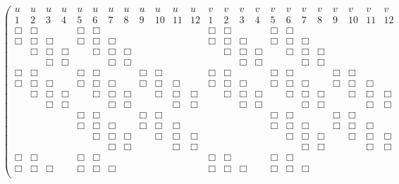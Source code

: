 \begin{equation}
\left(
\begin{array}{cccccccccccccccccccccccc}
u & u & u & u & u & u & u & u & u & u & u & u & 
v & v & v & v & v & v & v & v & v & v & v & v \\
1 & 2 & 3 & 4 & 5 & 6 & 7 & 8 & 9 & 10 & 11 & 12 &
1 & 2 & 3 & 4 & 5 & 6 & 7 & 8 & 9 & 10 & 11 & 12 \\
\Box& \Box & & & \Box & \Box  &  &  & & & & & \Box & \Box &  &  & \Box & \Box &  &  &  &  &  &  \\ %
\Box & \Box & \Box & & \Box & \Box & \Box &  & & & & & \Box & \Box & \Box &  & \Box & \Box & \Box &  &  &  &  &  \\ %
 & \Box &  \Box & \Box &  & \Box & \Box & \Box & & & &  & & \Box & \Box & \Box &  & \Box & \Box & \Box &  &  &  &  \\ %
& & \Box & \Box &  &  & \Box & \Box & & & & &  &  &  \Box & \Box &  &  & \Box & \Box &  &  &  \\ %
\Box& \Box & & & \Box & \Box &  &  & \Box & \Box & & & \Box& \Box & & & \Box & \Box &  &  & \Box & \Box & &   \\ %
\Box& \Box& \Box& & \Box & \Box & \Box &  & \Box & \Box & \Box & &
\Box& \Box& \Box& & \Box & \Box & \Box &  & \Box & \Box & \Box & \\ %
& \Box& \Box& \Box&  & \Box & \Box  & \Box  & & \Box& \Box& \Box& & \Box& \Box& \Box&  & \Box & \Box  & \Box  & & \Box& \Box& \Box \\ %
& & \Box & \Box &  &  & \Box & \Box & & & \Box & \Box & & & \Box & \Box &  &  & \Box & \Box & & & \Box & \Box \\ %
& & & & \Box & \Box &  &  & \Box & \Box & & &  &  &  &  & \Box & \Box &  &  & \Box & \Box &  \\ %
& & & & \Box & \Box & \Box &  & \Box & \Box & \Box & &  &  &  &  & \Box & \Box & \Box &  & \Box & \Box & \Box &  \\ %
& & & &  & \Box & \Box & \Box & &  \Box & \Box& \Box &  &  &  &  &  & \Box & \Box & \Box & &\Box & \Box & \Box \\ %
& & & &  &  & \Box & \Box & & & \Box & \Box &  &  &  &  &  &  & \Box & \Box &  &  & \Box &  \Box\\ %
\Box& \Box & & & \Box & \Box  &  &  & & & & & \Box & \Box &  &  & \Box & \Box &  &  &  &  &  &  \\ %
\Box & \Box & \Box & & \Box & \Box & \Box &  & & & & & \Box & \Box & \Box &  & \Box & \Box & \Box &  &  &  &  &  \\ %

\end{array}
\end{equation}
